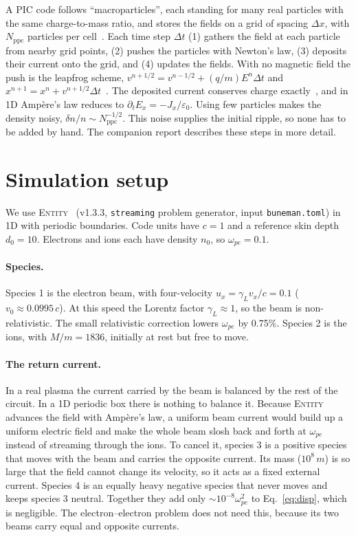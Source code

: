 \documentclass[10pt,twocolumn,letterpaper]{article}
\newcommand{\wpe}{\omega_{pe}}        %
\newcommand{\vz}{v_0}                 %
\newcommand{\ppc}{N_\mathrm{ppc}}     %
\begin{document}
A PIC code follows ``macroparticles'', each standing for many real particles with the same
charge-to-mass ratio, and stores the fields on a grid of spacing $\Delta x$, with $\ppc$
particles per cell~\citep{BirdsallLangdon1991,HockneyEastwood1988}. Each time step $\Delta t$
(1) gathers the field at each particle from nearby grid points, (2) pushes the particles with
Newton's law, (3) deposits their current onto the grid, and (4) updates the fields. With no
magnetic field the push is the leapfrog scheme, $v^{n+1/2}=v^{n-1/2}+(q/m)E^n\Delta t$ and
$x^{n+1}=x^n+v^{n+1/2}\Delta t$~\citep{Boris1970}. The deposited current conserves charge
exactly~\citep{Esirkepov2001,Umeda2003}, and in 1D Amp\`ere's law reduces to
$\partial_t E_x=-J_x/\varepsilon_0$. Using few particles makes the density noisy,
$\delta n/n\sim\ppc^{-1/2}$. This noise supplies the initial ripple, so none has to be added by
hand. The companion report describes these steps in more detail.

\section{Simulation setup}
\label{sec:setup}

We use \textsc{Entity}~\citep{Entity} (v1.3.3, \texttt{streaming} problem generator, input
\texttt{buneman.toml}) in 1D with periodic boundaries. Code units have $c=1$ and a reference
skin depth $d_0=10$. Electrons and ions each have density $n_0$, so $\wpe=0.1$.

\paragraph{Species.}
Species 1 is the electron beam, with four-velocity $u_x=\gamma_L v_x/c=0.1$
($\vz\approx0.0995\,c$). At this speed the Lorentz factor $\gamma_L\approx1$, so the beam is
non-relativistic. The small relativistic correction lowers $\wpe$ by 0.75\%. Species 2 is the
ions, with $M/m=1836$, initially at rest but free to move.

\paragraph{The return current.}
In a real plasma the current carried by the beam is balanced by the rest of the circuit. In a
1D periodic box there is nothing to balance it. Because \textsc{Entity} advances the field with
Amp\`ere's law, a uniform beam current would build up a uniform electric field and make the
whole beam slosh back and forth at $\wpe$ instead of streaming through the ions. To cancel it,
species 3 is a positive species that moves with the beam and carries the opposite current. Its
mass ($10^8\,m$) is so large that the field cannot change its velocity, so it acts as a fixed
external current. Species 4 is an equally heavy negative species that never moves and keeps
species 3 neutral. Together they add only $\sim10^{-8}\wpe^2$ to Eq.~\eqref{eq:disp}, which is
negligible. The electron--electron problem does not need this, because its two beams carry
equal and opposite currents.
\end{document}
